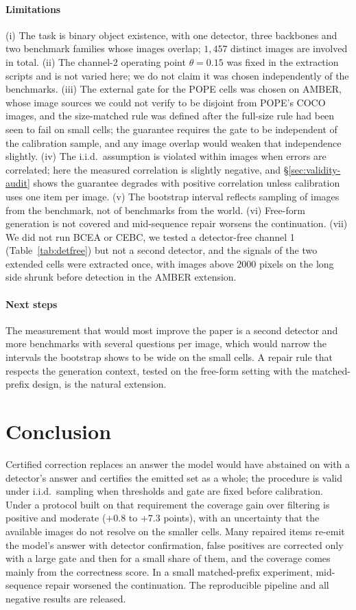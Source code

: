 \paragraph{Limitations}
(i) The task is binary object existence, with one detector, three backbones and two benchmark families whose
images overlap; $1{,}457$ distinct images are involved in total. (ii) The channel-2 operating point $\theta=0.15$ was fixed
in the extraction scripts and is not varied here; we do not claim it was chosen independently of the benchmarks.
(iii) The external gate for the POPE cells was chosen on AMBER, whose image sources we could not verify to be disjoint from
POPE's COCO images, and the size-matched rule was defined after the full-size rule had been seen to fail on small cells; the guarantee requires the gate to be independent of the calibration sample, and any image overlap
would weaken that independence slightly. (iv) The i.i.d.\ assumption is violated within images when errors are correlated; here the
measured correlation is slightly negative, and \S\ref{sec:validity-audit} shows the guarantee degrades with positive
correlation unless calibration uses one item per image. (v) The bootstrap interval reflects sampling of images from the benchmark, not
of benchmarks from the world. (vi) Free-form generation is not covered and mid-sequence repair worsens the continuation.
(vii) We did not run BCEA or CEBC, we tested a detector-free channel 1 (Table~\ref{tab:detfree}) but not a second detector, and the signals of the two extended cells were extracted once, with images above $2000$ pixels on the long side shrunk before detection in the AMBER extension.

\paragraph{Next steps}
The measurement that would most improve the paper is a second detector and more benchmarks with several questions per image, which would narrow the
intervals the bootstrap shows to be wide on the small cells. A repair rule that
respects the generation context, tested on the free-form setting with the matched-prefix design, is the natural
extension.

\section{Conclusion}
\label{sec:conclusion}

Certified correction replaces an answer the model would have abstained on with a detector's answer and
certifies the emitted set as a whole; the procedure is valid under i.i.d.\ sampling when thresholds and gate are
fixed before calibration. Under a protocol built on that requirement the coverage gain over filtering is positive and moderate ($+0.8$ to $+7.3$ points), with
an uncertainty that the available images do not resolve on the smaller cells. Many repaired items re-emit the model's answer with detector
confirmation, false positives are corrected only with a large gate and then for a small share of them, and the coverage comes mainly from
the correctness score.
In a small matched-prefix experiment, mid-sequence repair worsened the continuation. The reproducible pipeline and all negative results are released.
